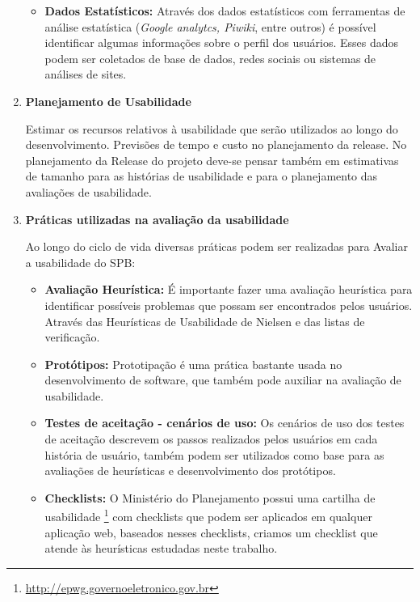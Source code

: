 \begin{enumerate}
\begin{itemize}
		\item \textbf{Dados Estatísticos:} Através dos dados estatísticos com ferramentas de análise estatística (\textit{Google analytcs, Piwiki}, entre outros) é possível identificar algumas informações sobre o perfil dos usuários. Esses dados podem ser coletados de base de dados, redes sociais ou sistemas de análises de sites. 

	\end{itemize}
		
	\item \textbf{Planejamento de Usabilidade}

	Estimar os recursos relativos à usabilidade que serão utilizados ao longo do desenvolvimento. Previsões de tempo e custo no planejamento da release. No planejamento da Release do projeto deve-se pensar também em estimativas de tamanho para as histórias de usabilidade e para o planejamento das avaliações de usabilidade.

	\item \textbf{Práticas utilizadas na avaliação da usabilidade}

	Ao longo do ciclo de vida diversas práticas podem ser realizadas para Avaliar a usabilidade do SPB:
		
	\begin{itemize}
		\item \textbf{Avaliação Heurística: }É importante fazer uma avaliação heurística para identificar possíveis problemas que possam ser encontrados pelos usuários. Através das Heurísticas de Usabilidade de Nielsen e das listas de verificação. 
	
		\item \textbf{Protótipos: }Prototipação é uma prática bastante usada no desenvolvimento de software, que também pode auxiliar na avaliação de usabilidade.

		\item \textbf{Testes de aceitação - cenários de uso: }Os cenários de uso dos testes de aceitação descrevem os passos realizados pelos usuários em cada história de usuário, também podem ser utilizados como base para as avaliações de heurísticas e desenvolvimento dos protótipos.

		\item \textbf{Checklists: }O Ministério do Planejamento possui uma cartilha de usabilidade \footnote{\url{http://epwg.governoeletronico.gov.br}} com checklists que podem ser aplicados em qualquer aplicação web, baseados nesses checklists, criamos um checklist que atende às heurísticas estudadas neste trabalho.


\end{itemize}
\end{enumerate}
